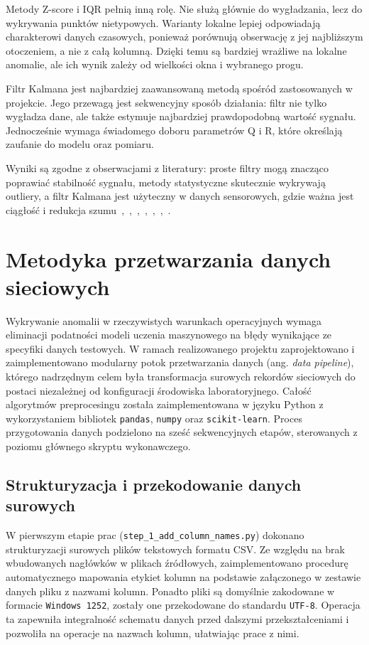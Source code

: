 \documentclass[12pt,twoside]{article}
\begin{document}
Metody Z-score i IQR pełnią
inną rolę. Nie służą głównie do wygładzania, lecz do
wykrywania punktów nietypowych. Warianty lokalne lepiej odpowiadają
charakterowi danych czasowych, ponieważ porównują obserwację z
jej najbliższym otoczeniem, a nie z całą kolumną. Dzięki temu są
bardziej wrażliwe na lokalne anomalie, ale ich wynik zależy od
wielkości okna i wybranego progu.


Filtr Kalmana jest najbardziej
zaawansowaną metodą spośród zastosowanych w projekcie. Jego
przewagą jest sekwencyjny sposób działania: filtr nie tylko
wygładza dane, ale także estymuje najbardziej prawdopodobną
wartość sygnału. Jednocześnie wymaga świadomego doboru
parametrów Q i R, które określają zaufanie do modelu oraz
pomiaru.


Wyniki są zgodne z
obserwacjami z literatury: proste filtry mogą znacząco poprawiać
stabilność sygnału, metody statystyczne skutecznie wykrywają
outliery, a filtr Kalmana jest użyteczny w danych sensorowych, gdzie
ważna jest ciągłość i redukcja szumu~\cite{bib:ioe1},~\cite{bib:ioe2},~\cite{bib:ioe3},~\cite{bib:ioe4},~\cite{bib:ioe5},~\cite{bib:ioe6},~\cite{bib:ioe7}.

\section{Metodyka przetwarzania danych sieciowych}

Wykrywanie anomalii w rzeczywistych warunkach operacyjnych wymaga eliminacji podatności modeli uczenia maszynowego na błędy wynikające ze specyfiki danych testowych. 
W ramach realizowanego projektu zaprojektowano i zaimplementowano modularny potok przetwarzania danych (ang. \emph{data pipeline}), którego nadrzędnym celem była transformacja surowych rekordów sieciowych do postaci niezależnej od konfiguracji środowiska laboratoryjnego. 
Całość algorytmów preprocesingu została zaimplementowana w języku Python z wykorzystaniem bibliotek \texttt{pandas}, \texttt{numpy} oraz \texttt{scikit-learn}. 
Proces przygotowania danych podzielono na sześć sekwencyjnych etapów, sterowanych z poziomu głównego skryptu wykonawczego.

\subsection{Strukturyzacja i przekodowanie danych surowych}

W pierwszym etapie prac (\texttt{step\_1\_add\_column\_names.py}) dokonano strukturyzacji surowych plików tekstowych formatu CSV. 
Ze względu na brak wbudowanych nagłówków w plikach źródłowych, zaimplementowano procedurę automatycznego mapowania etykiet kolumn na podstawie załączonego w zestawie danych pliku z nazwami kolumn.
Ponadto pliki są domyślnie zakodowane w formacie \texttt{Windows 1252}, zostały one przekodowane do standardu \texttt{UTF-8}.
Operacja ta zapewniła integralność schematu danych przed dalszymi przekształceniami i pozwoliła na operacje na nazwach kolumn, ułatwiając prace z nimi.
\end{document}
